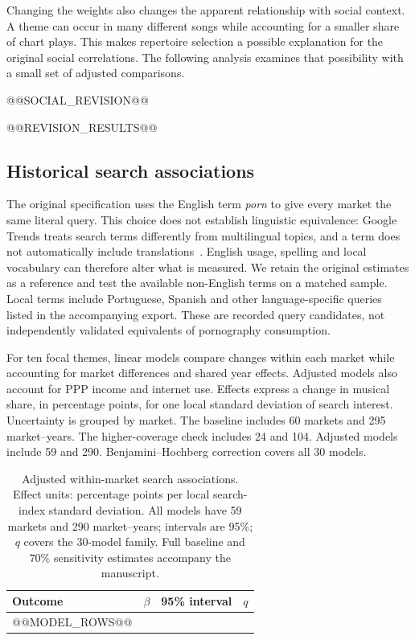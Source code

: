 \documentclass[10pt,a4paper,twocolumn]{article}
\begin{document}
Changing the weights also changes the apparent relationship with social context. A theme can occur in many different songs while accounting for a smaller share of chart plays. This makes repertoire selection a possible explanation for the original social correlations. The following analysis examines that possibility with a small set of adjusted comparisons.

@@SOCIAL_REVISION@@

@@REVISION_RESULTS@@

\subsection{Historical search associations}
The original specification uses the English term \textit{porn} to give every market the same literal query. This choice does not establish linguistic equivalence: Google Trends treats search terms differently from multilingual topics, and a term does not automatically include translations~\cite{trendscompare}. English usage, spelling and local vocabulary can therefore alter what is measured. We retain the original estimates as a reference and test the available non-English terms on a matched sample. Local terms include Portuguese, Spanish and other language-specific queries listed in the accompanying export. These are recorded query candidates, not independently validated equivalents of pornography consumption.

For ten focal themes, linear models compare changes within each market while accounting for market differences and shared year effects. Adjusted models also account for PPP income and internet use. Effects express a change in musical share, in percentage points, for one local standard deviation of search interest. Uncertainty is grouped by market. The baseline includes 60 markets and 295 market--years. The higher-coverage check includes 24 and 104. Adjusted models include 59 and 290. Benjamini--Hochberg correction covers all 30 models.

\begin{table}[t]
\caption{Adjusted within-market search associations. Effect units: percentage points per local search-index standard deviation. All models have 59 markets and 290 market--years; intervals are 95\%; $q$ covers the 30-model family. Full baseline and 70\% sensitivity estimates accompany the manuscript.}
\label{tab:models}
\centering\small\setlength{\tabcolsep}{3pt}
\begin{tabularx}{\textwidth}{@{}Xrrr@{}}
\toprule Outcome & $\beta$ & 95\% interval & $q$ \\
\midrule
@@MODEL_ROWS@@
\bottomrule
\end{tabularx}
\end{table}
\end{document}
